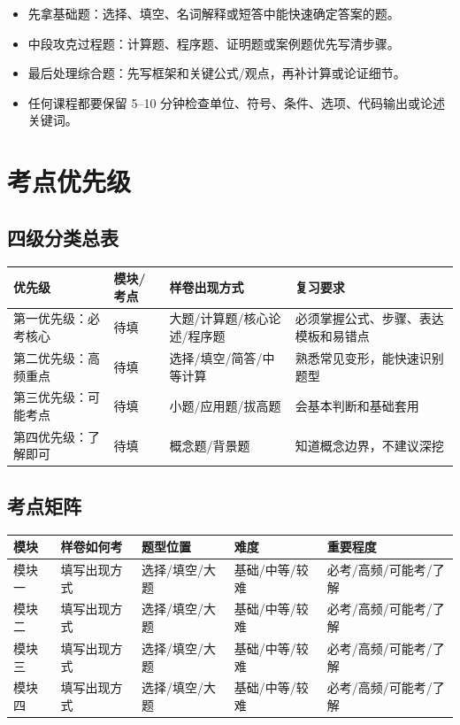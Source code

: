 \documentclass[UTF8,zihao=-4]{ctexart}
\begin{document}
\begin{methodbox}[时间分配建议]
\begin{itemize}
  \item 先拿基础题：选择、填空、名词解释或短答中能快速确定答案的题。
  \item 中段攻克过程题：计算题、程序题、证明题或案例题优先写清步骤。
  \item 最后处理综合题：先写框架和关键公式/观点，再补计算或论证细节。
  \item 任何课程都要保留 5--10 分钟检查单位、符号、条件、选项、代码输出或论述关键词。
\end{itemize}
\end{methodbox}

\section{考点优先级}

\subsection{四级分类总表}

\begin{longtable}{p{}p{}p{}p{}}
\toprule
\textbf{优先级} & \textbf{模块/考点} & \textbf{样卷出现方式} & \textbf{复习要求} \\
\midrule
第一优先级：必考核心 & 待填 & 大题/计算题/核心论述/程序题 & 必须掌握公式、步骤、表达模板和易错点 \\
第二优先级：高频重点 & 待填 & 选择/填空/简答/中等计算 & 熟悉常见变形，能快速识别题型 \\
第三优先级：可能考点 & 待填 & 小题/应用题/拔高题 & 会基本判断和基础套用 \\
第四优先级：了解即可 & 待填 & 概念题/背景题 & 知道概念边界，不建议深挖 \\
\bottomrule
\end{longtable}

\subsection{考点矩阵}

\begin{longtable}{p{}p{}p{}p{}p{}}
\toprule
\textbf{模块} & \textbf{样卷如何考} & \textbf{题型位置} & \textbf{难度} & \textbf{重要程度} \\
\midrule
模块一 & 填写出现方式 & 选择/填空/大题 & 基础/中等/较难 & 必考/高频/可能考/了解 \\
模块二 & 填写出现方式 & 选择/填空/大题 & 基础/中等/较难 & 必考/高频/可能考/了解 \\
模块三 & 填写出现方式 & 选择/填空/大题 & 基础/中等/较难 & 必考/高频/可能考/了解 \\
模块四 & 填写出现方式 & 选择/填空/大题 & 基础/中等/较难 & 必考/高频/可能考/了解 \\
\bottomrule
\end{longtable}
\end{document}
